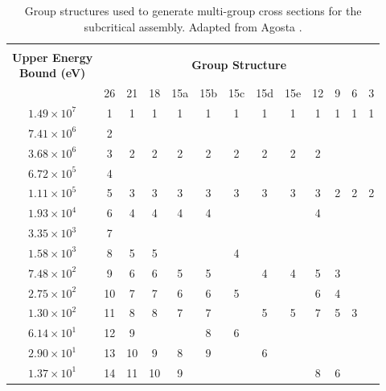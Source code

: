 \begin{table}[H]
    \singlespacing
    \centering
    \caption[Group structures used to generate multi-group cross sections for the subcritical assembly.]{Group structures used to generate multi-group cross sections for the subcritical assembly. Adapted from Agosta \cite{agosta_htgr}.}
    \begin{tabular}{|c|cccccccccccc|}
        \hline
          & \multicolumn{12}{c|}{}\\
         \makecell{\textbf{Upper Energy} \\ \textbf{Bound (eV)}} & \multicolumn{12}{c|}{\textbf{Group Structure}}\\
          & 26 & 21 & 18 & 15a & 15b & 15c & 15d & 15e & 12 & 9 & 6 & 3\\
         \hline
         $1.49\times 10^{7}$  & 1  & 1  & 1  & 1  & 1  & 1  & 1  & 1  & 1  & 1 & 1 & 1\\
         $7.41\times 10^{6}$  & 2  &    &    &    &    &    &    &    &    &   &   &  \\
         $3.68\times 10^{6}$  & 3  & 2  & 2  & 2  & 2  & 2  & 2  & 2  & 2  &   &   &  \\
         $6.72\times 10^{5}$  & 4  &    &    &    &    &    &    &    &    &   &   &  \\
         $1.11\times 10^{5}$  & 5  & 3  & 3  & 3  & 3  & 3  & 3  & 3  & 3  & 2 & 2 & 2\\
         $1.93\times 10^{4}$  & 6  & 4  & 4  & 4  & 4  &    &    &    & 4  &   &   &  \\
         $3.35\times 10^{3}$  & 7  &    &    &    &    &    &    &    &    &   &   &  \\
         $1.58\times 10^{3}$  & 8  & 5  & 5  &    &    & 4  &    &    &    &   &   &  \\
         $7.48\times 10^{2}$  & 9  & 6  & 6  & 5  & 5  &    & 4  & 4  & 5  & 3 &   &  \\
         $2.75\times 10^{2}$  & 10 & 7  & 7  & 6  & 6  & 5  &    &    & 6  & 4 &   &  \\
         $1.30\times 10^{2}$  & 11 & 8  & 8  & 7  & 7  &    & 5  & 5  & 7  & 5 & 3 &  \\
         $6.14\times 10^{1}$  & 12 & 9  &    &    & 8  & 6  &    &    &    &   &   &  \\
         $2.90\times 10^{1}$  & 13 & 10 & 9  & 8  & 9  &    & 6  &    &    &   &   &  \\
         $1.37\times 10^{1}$  & 14 & 11 & 10 & 9  &    &    &    &    & 8  & 6 &   &  \\

\end{tabular}
\end{table}
